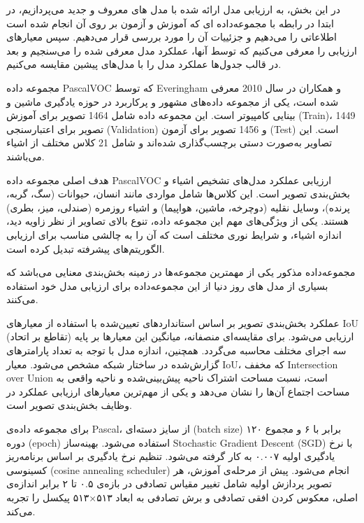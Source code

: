 
\label{section:experiment}

در این بخش، به ارزیابی مدل ارائه شده با مدل های معروف و جدید می‌پردازیم، در ابتدا در رابطه با مجموعه‌داده ای که آموزش و آزمون بر روی آن انجام شده است اطلاعاتی را می‌دهیم و جزئییات آن را مورد بررسی قرار می‌دهیم. سپس معیارهای ارزیابی را معرفی می‌کنیم که توسط آنها، عملکرد مدل معرفی شده را می‌سنجیم و بعد در قالب جدول‌ها عملکرد مدل را با مدل‌های پیشین مقایسه می‌کنیم.


مجموعه داده PascalVOC که توسط Everingham و همکاران در سال 2010 معرفی شده است، یکی از مجموعه داده‌های مشهور و پرکاربرد در حوزه یادگیری ماشین و بینایی کامپیوتر است\cite{Everingham2010ThePV}. این مجموعه داده شامل 1464 تصویر برای آموزش (Train)، 1449 تصویر برای اعتبارسنجی (Validation) و 1456 تصویر برای آزمون (Test) است. این تصاویر به‌صورت دستی برچسب‌گذاری شده‌اند و شامل 21 کلاس مختلف از اشیاء می‌باشند.

هدف اصلی مجموعه داده PascalVOC ارزیابی عملکرد مدل‌های تشخیص اشیاء و بخش‌بندی تصویر است. این کلاس‌ها شامل مواردی مانند انسان، حیوانات (سگ، گربه، پرنده)، وسایل نقلیه (دوچرخه، ماشین، هواپیما) و اشیاء روزمره (صندلی، میز، بطری) هستند. یکی از ویژگی‌های مهم این مجموعه داده، تنوع بالای تصاویر از نظر زاویه دید، اندازه اشیاء، و شرایط نوری مختلف است که آن را به چالشی مناسب برای ارزیابی الگوریتم‌های پیشرفته تبدیل کرده است.

مجموعه‌داده مذکور یکی از مهمترین مجموعه‌ها در زمینه بخش‌بندی معنایی می‌باشد که بسیاری از مدل های روز دنیا از این مجموعه‌داده برای ارزیابی مدل خود استفاده می‌کنند.



عملکرد بخش‌بندی تصویر بر اساس استانداردهای تعیین‌شده با استفاده از معیارهای IoU (تقاطع بر اتحاد) ارزیابی می‌شود. برای مقایسه‌ای منصفانه، میانگین این معیارها بر پایه سه اجرای مختلف محاسبه می‌گردد. همچنین، اندازه مدل با توجه به تعداد پارامترهای گزارش‌شده در ساختار شبکه مشخص می‌شود. معیار IoU، که مخفف Intersection over Union است، نسبت مساحت اشتراک ناحیه پیش‌بینی‌شده و ناحیه واقعی به مساحت اجتماع آن‌ها را نشان می‌دهد و یکی از مهم‌ترین معیارهای ارزیابی عملکرد در وظایف بخش‌بندی تصویر است.


برای مجموعه داده‌ی Pascal، از سایز دسته‌ای (batch size) برابر با ۶ و مجموع ۱۲۰ دوره (epoch) استفاده می‌شود. بهینه‌ساز Stochastic Gradient Descent (SGD) با نرخ یادگیری اولیه ۰.۰۰۷ به کار گرفته می‌شود. تنظیم نرخ یادگیری بر اساس برنامه‌ریز کسینوسی (cosine annealing scheduler) انجام می‌شود. پیش از مرحله‌ی آموزش، هر تصویر پردازش اولیه شامل تغییر مقیاس تصادفی در بازه‌ی ۰.۵ تا ۲ برابر اندازه‌ی اصلی، معکوس کردن افقی تصادفی و برش تصادفی به ابعاد ۵۱۳×۵۱۳ پیکسل را تجربه می‌کند.

